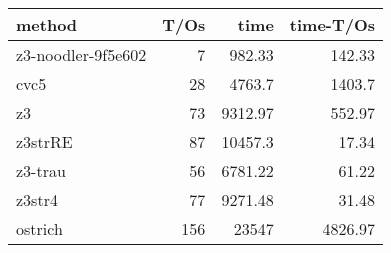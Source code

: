 \begin{tabular}{lrrr}
\hline
 method             &   T/Os &     time &   time-T/Os \\
\hline
 z3-noodler-9f5e602 &      7 &   982.33 &      142.33 \\
 cvc5               &     28 &  4763.7  &     1403.7  \\
 z3                 &     73 &  9312.97 &      552.97 \\
 z3strRE            &     87 & 10457.3  &       17.34 \\
 z3-trau            &     56 &  6781.22 &       61.22 \\
 z3str4             &     77 &  9271.48 &       31.48 \\
 ostrich            &    156 & 23547    &     4826.97 \\
\hline
\end{tabular}
